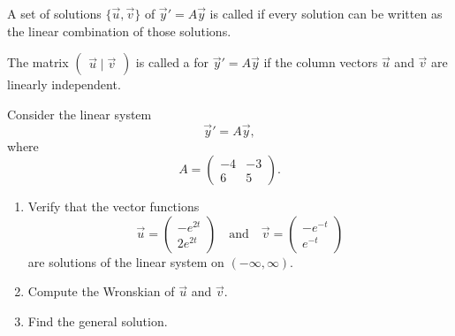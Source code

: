 A set of solutions $\{\vec{u}, \vec{v}\}$ of $\vec{y}'=A\vec{y}$ is called  if every solution can be written as the linear combination of those solutions.

The matrix $\begin{pmatrix}
  \vec{u} \mid \vec{v}
\end{pmatrix}$ is called a  for $\vec{y}'=A\vec{y}$ if the column vectors $\vec{u}$ and $\vec{v}$ are linearly independent.

\begin{example}
  Consider the linear system
  \[\vec{y}' = A\vec{y},\]
  where
  \[A =
  \begin{pmatrix}
     -4 & -3 \\ 6 & 5
  \end{pmatrix}.
  \]
  \begin{enumerate}
    \item 
    Verify that the vector functions
  \[\vec{u}=\begin{pmatrix}
    -e^{2t}\\ 2e^{2t}
  \end{pmatrix} \quad \text{and} \quad \vec{v}=\begin{pmatrix}
    -e^{-t} \\  e^{-t}
  \end{pmatrix}\]
  are solutions of the linear system  on $(-\infty, \infty)$.
  \item 
  Compute the Wronskian of $\vec{u}$ and $\vec{v}$.
  \item 
  Find the general solution.
  \end{enumerate}
\end{example}
